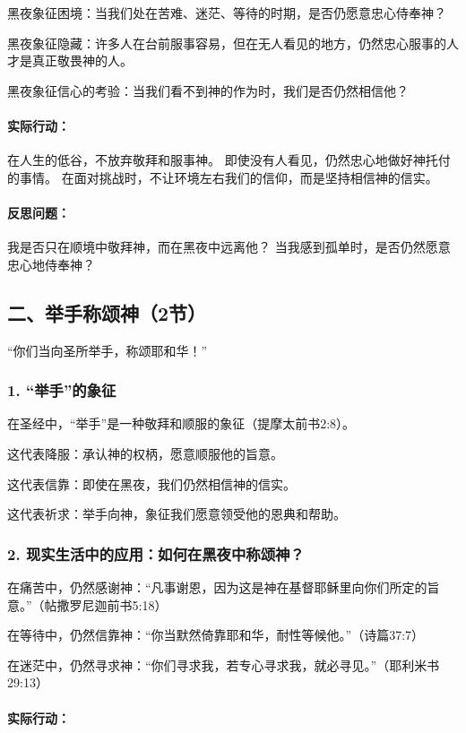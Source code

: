 \documentclass[a4paper, 12pt]{article}
\begin{document}
\hspace{0.6cm}黑夜象征困境：当我们处在苦难、迷茫、等待的时期，是否仍愿意忠心侍奉神？

黑夜象征隐藏：许多人在台前服事容易，但在无人看见的地方，仍然忠心服事的人才是真正敬畏神的人。

黑夜象征信心的考验：当我们看不到神的作为时，我们是否仍然相信他？
\paragraph*{实际行动：}

在人生的低谷，不放弃敬拜和服事神。
即使没有人看见，仍然忠心地做好神托付的事情。
在面对挑战时，不让环境左右我们的信仰，而是坚持相信神的信实。
\paragraph*{反思问题：}

我是否只在顺境中敬拜神，而在黑夜中远离他？
当我感到孤单时，是否仍然愿意忠心地侍奉神？
\subsection*{二、举手称颂神（2节）}
“你们当向圣所举手，称颂耶和华！”

\subsubsection*{1. “举手”的象征}
在圣经中，“举手”是一种敬拜和顺服的象征（提摩太前书2:8）。

这代表降服：承认神的权柄，愿意顺服他的旨意。

这代表信靠：即使在黑夜，我们仍然相信神的信实。

这代表祈求：举手向神，象征我们愿意领受他的恩典和帮助。

\subsubsection*{2. 现实生活中的应用：如何在黑夜中称颂神？}
\hspace{0.6cm}在痛苦中，仍然感谢神：“凡事谢恩，因为这是神在基督耶稣里向你们所定的旨意。”（帖撒罗尼迦前书5:18）

在等待中，仍然信靠神：“你当默然倚靠耶和华，耐性等候他。”（诗篇37:7）

在迷茫中，仍然寻求神：“你们寻求我，若专心寻求我，就必寻见。”（耶利米书29:13）

\paragraph*{实际行动：}
\end{document}
